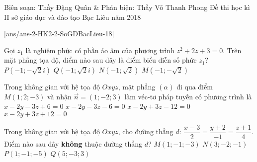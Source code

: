\begin{name}
{Biên soạn: Thầy Đặng Quân  \& Phản biện: Thầy Võ Thanh Phong}
{Đề thi học kì II sở giáo dục và đào tạo Bạc Liêu năm 2018}
\end{name}
\setcounter{ex}{0}\setcounter{bt}{0}
[ans/ans-2-HK2-2-SoGDBacLieu-18]

\begin{ex}%
Gọi $z_1$ là nghiệm phức có phần ảo âm của phương trình $z^2+2z+3=0$. Trên mặt phẳng tọa độ, điểm nào sau đây là điểm biểu diễn số phức $z_1$?
\choice 
{$P(-1;-\sqrt{2}i)$}
{$Q(-1;\sqrt{2}i)$}
{$N(-1;\sqrt{2})$}
{\True $M(-1;-\sqrt{2})$}
\end{ex}
\begin{ex}%
Trong không gian với hệ tọa độ $Oxyz$, mặt phẳng $(\alpha)$ đi qua điểm $M(1;2;-3)$ và nhận $\vec{n}=(1;-2;3)$ làm véc-tơ pháp tuyến có phương trình là
\choice 
{$x-2y-3z+6=0$}
{$x-2y-3z-6=0$}
{$x-2y+3z-12=0$}
{\True $x-2y+3z+12=0$}

\end{ex}
\begin{ex}%
Trong không gian với hệ tọa độ $Oxyz$, cho đường thẳng $d$: $\dfrac{x-3}{2}=\dfrac{y+2}{-1}=\dfrac{z+1}{4}$. Điểm nào sau đây \textbf{không} thuộc đường thẳng $d$?
\choice 
{\True $M(1;-1;-3)$}
{$N(3;-2;-1)$}
{$P(1;-1;-5)$}
{$Q(5;-3;3)$}
\end{ex}
